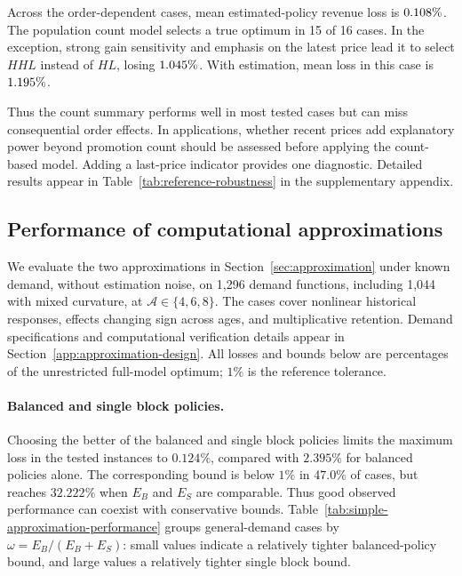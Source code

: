 Across the order-dependent cases, mean estimated-policy revenue loss is \(0.108\%\). The population count model selects a true optimum in 15 of 16 cases. In the exception, strong gain sensitivity and emphasis on the latest price lead it to select \(HHL\) instead of \(HL\), losing \(1.045\%\). With estimation, mean loss in this case is \(1.195\%\).

Thus the count summary performs well in most tested cases but can miss consequential order effects. In applications, whether recent prices add explanatory power beyond promotion count should be assessed before applying the count-based model. Adding a last-price indicator provides one diagnostic. Detailed results appear in Table~\ref{tab:reference-robustness} in the supplementary appendix.

\subsection{Performance of computational approximations}
\label{sec:approximation-numerics}

\begingroup\color{blue}
We evaluate the two approximations in Section~\ref{sec:approximation} under known demand, without estimation noise, on 1,296 demand functions, including 1,044 with mixed curvature, at \(\mathcal A\in\{4,6,8\}\). The cases cover nonlinear historical responses, effects changing sign across ages, and multiplicative retention. Demand specifications and computational verification details appear in Section~\ref{app:approximation-design}. All losses and bounds below are percentages of the unrestricted full-model optimum; \(1\%\) is the reference tolerance.
\par\endgroup

\paragraph{Balanced and single block policies.}
\begingroup\color{blue}
Choosing the better of the balanced and single block policies limits the maximum loss in the tested instances to \(0.124\%\), compared with \(2.395\%\) for balanced policies alone. The corresponding bound is below \(1\%\) in \(47.0\%\) of cases, but reaches \(32.222\%\) when \(E_B\) and \(E_S\) are comparable. Thus good observed performance can coexist with conservative bounds. Table~\ref{tab:simple-approximation-performance} groups general-demand cases by \(\omega=E_B/(E_B+E_S)\): small values indicate a relatively tighter balanced-policy bound, and large values a relatively tighter single block bound.
\par\endgroup

